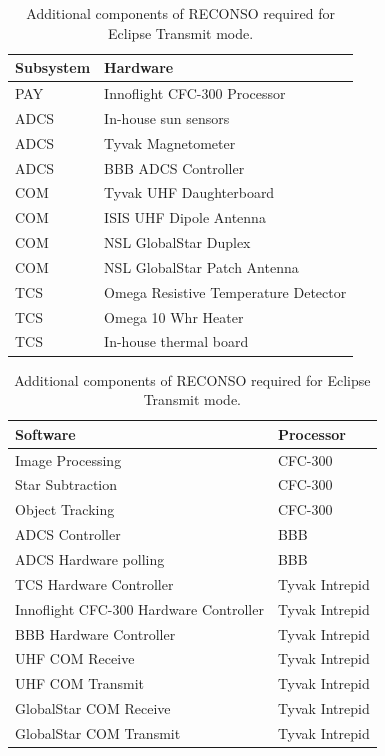 \documentclass{article}
\begin{document}
\begin{table}[h!]
\caption{Additional components of RECONSO required for Eclipse Transmit mode.}
\begin{adjustbox}{center}
\begin{tabular}{|l|l|}
\hline
Subsystem & Hardware \\ \hline \hline
PAY & Innoflight CFC-300 Processor  \\ \hline \hline
ADCS & In-house sun sensors  \\ \hline
ADCS & Tyvak Magnetometer \\ \hline
ADCS & BBB ADCS Controller \\ \hline \hline
COM & Tyvak UHF Daughterboard  \\ \hline
COM & ISIS UHF Dipole Antenna  \\ \hline
COM & NSL GlobalStar Duplex  \\ \hline
COM & NSL GlobalStar Patch Antenna \\ \hline \hline
TCS & Omega Resistive Temperature Detector \\ \hline
TCS & Omega 10 Whr Heater  \\ \hline
TCS & In-house thermal board \\ \hline
\end{tabular}

\quad

\begin{tabular}{|l|l|}
\hline
Software & Processor \\ \hline \hline
Image Processing & CFC-300 \\ \hline
Star Subtraction & CFC-300 \\ \hline
Object Tracking & CFC-300 \\ \hline \hline
ADCS Controller & BBB \\ \hline
ADCS Hardware polling & BBB \\ \hline \hline
TCS Hardware Controller & Tyvak Intrepid \\ \hline
Innoflight CFC-300 Hardware Controller & Tyvak Intrepid \\ \hline
BBB Hardware Controller & Tyvak Intrepid \\ \hline
UHF COM Receive & Tyvak Intrepid \\ \hline
UHF COM Transmit & Tyvak Intrepid \\ \hline
GlobalStar COM Receive & Tyvak Intrepid \\ \hline
GlobalStar COM Transmit & Tyvak Intrepid \\ \hline
\end{tabular}
\end{adjustbox}
\end{table}
\end{document}
